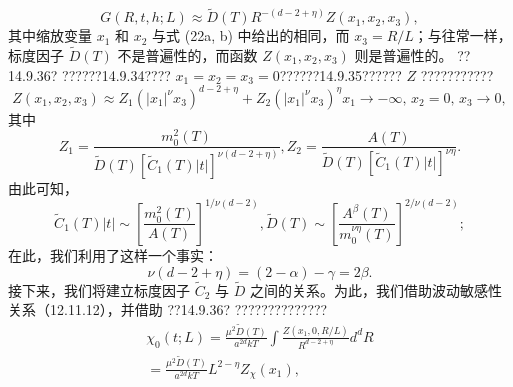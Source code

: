 \begin{equation}\tag{14.4.90}\label{eq:14.4.90}
G ( R , t , h ; L ) \approx \tilde { D } ( T ) R ^{- ( d - 2 + \eta )} Z ( x _ { 1 } , x _ { 2 } , x _ { 3 } ) ,
\end{equation}
其中缩放变量 \(x_{1}\) 和 \(x_{2}\) 与式 (22a, b) 中给出的相同，而 \(x_{3}=R/L\)；与往常一样，标度因子 \(\tilde{D}(T)\) 不是普遍性的，而函数 \(Z(x_{1},x_{2},x_{3})\) 则是普遍性的。
??14.9.36? ??????14.9.34???? \(x_{1}=x_{2}=x_{3}=0\)??????14.9.35?????? \(Z\) ???????????
\begin{equation}\tag{14.4.91}\label{eq:14.4.91}
Z ( x _ { 1 } , x _ { 2 } , x _ { 3 } ) \approx Z _ { 1 } \left( | x _ { 1 } | ^{\nu} x _ { 3 } \right) ^{d - 2 + \eta} + Z _ { 2 } ( | x _ { 1 } | ^{\nu} x _ { 3 } ) ^{\eta}  x _ { 1 } \rightarrow - \infty , \, x _ { 2 } = 0 , \, x _ { 3 } \rightarrow 0 ,
\end{equation}
其中
\begin{equation}\tag{14.4.92}\label{eq:14.4.92}
Z _ { 1 } = \frac { m _ { 0 } ^{2} ( T ) } { \tilde { D } ( T ) [ \tilde { C } _ { 1 } ( T ) | t | ] ^{\nu ( d - 2 + \eta )} } ,  Z _ { 2 } = \frac { A ( T ) } { \tilde { D } ( T ) [ \tilde { C } _ { 1 } ( T ) | t | ] ^{\nu \eta} } .
\end{equation}
由此可知，
\begin{equation}\tag{14.4.93}\label{eq:14.4.93}
\tilde { C } _ { 1 } ( T ) | t | \sim \left[ \frac { m _ { 0 } ^{2} ( T ) } { A ( T ) } \right] ^{1 / \nu ( d - 2 )} ,  \tilde { D } ( T ) \sim \left[ \frac { A ^{\beta} ( T ) } { m _ { 0 } ^{\nu \eta} ( T ) } \right] ^{2 / \nu ( d - 2 )} ;
\end{equation}
在此，我们利用了这样一个事实：
\begin{equation}\tag{14.4.94}\label{eq:14.4.94}
\nu ( d - 2 + \eta ) = ( 2 - \alpha ) - \gamma = 2 \beta .
\end{equation}
接下来，我们将建立标度因子 \(\tilde{C}_{2}\) 与 \(\tilde{D}\) 之间的关系。为此，我们借助波动敏感性关系（12.11.12），并借助
??14.9.36? ??????????????
\begin{equation}\tag{14.4.95}\label{eq:14.4.95}
\begin{array}{r} { \chi _ { 0 } ( t ; L ) = \frac { \mu ^{2} \tilde { D } ( T ) } { a ^{2 d} k T } \int \frac { Z ( x _ { 1 } , 0 , R / L ) } { R ^{d - 2 + \eta} } d ^{d} R } \\{ = \frac { \mu ^{2} \tilde { D } ( T ) } { a ^{2 d} k T } L ^{2 - \eta} Z _ { \chi } ( x _ { 1 } ) , } \end{array}
\end{equation}
